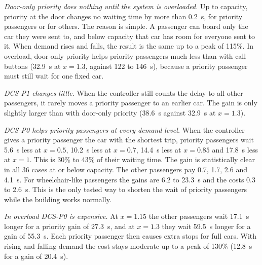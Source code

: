 \emph{Door-only priority does nothing until the system is overloaded.} Up to capacity, priority at the door changes no waiting time by more than 0.2~s, for priority passengers or for others. The reason is simple. A passenger can board only the car they were sent to, and below capacity that car has room for everyone sent to it. When demand rises and falls, the result is the same up to a peak of 115\%. In overload, door-only priority helps priority passengers much less than with call buttons (32.9~s at $x=1.3$, against 122 to 146~s), because a priority passenger must still wait for one fixed car.

\emph{DCS-P1 changes little.} When the controller still counts the delay to all other passengers, it rarely moves a priority passenger to an earlier car. The gain is only slightly larger than with door-only priority (38.6~s against 32.9~s at $x=1.3$).

\emph{DCS-P0 helps priority passengers at every demand level.} When the controller gives a priority passenger the car with the shortest trip, priority passengers wait 5.6~s less at $x=0.5$, 10.2~s less at $x=0.7$, 14.4~s less at $x=0.85$ and 17.8~s less at $x=1$. This is 30\% to 43\% of their waiting time. The gain is statistically clear in all 36 cases at or below capacity. The other passengers pay 0.7, 1.7, 2.6 and 4.1~s. For wheelchair-like passengers the gains are 6.2 to 23.3~s and the costs 0.3 to 2.6~s. This is the only tested way to shorten the wait of priority passengers while the building works normally.

\emph{In overload DCS-P0 is expensive.} At $x=1.15$ the other passengers wait 17.1~s longer for a priority gain of 27.3~s, and at $x=1.3$ they wait 59.5~s longer for a gain of 55.3~s. Each priority passenger then causes extra stops for full cars. With rising and falling demand the cost stays moderate up to a peak of 130\% (12.8~s for a gain of 20.4~s).

